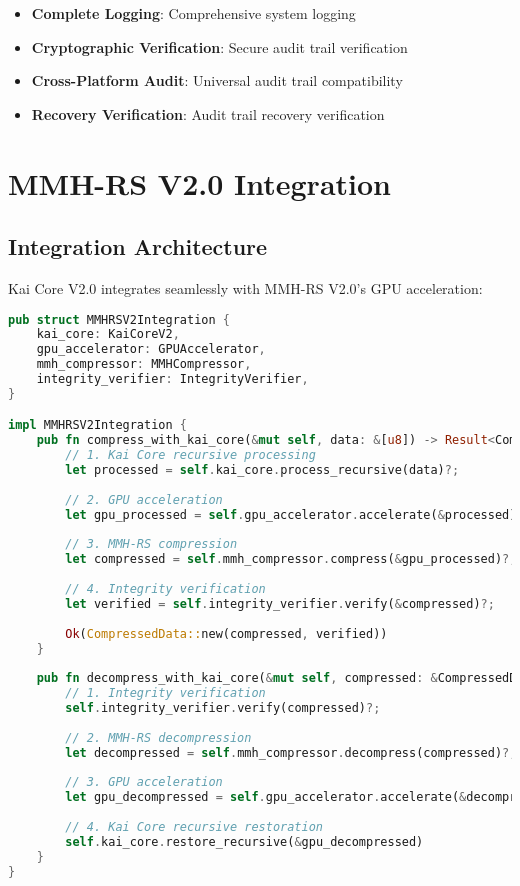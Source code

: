 \documentclass[12pt,a4paper]{article}
\begin{document}
\begin{itemize}
    \item \textbf{Complete Logging}: Comprehensive system logging
    \item \textbf{Cryptographic Verification}: Secure audit trail verification
    \item \textbf{Cross-Platform Audit}: Universal audit trail compatibility
    \item \textbf{Recovery Verification}: Audit trail recovery verification
\end{itemize}

\newpage

\section{MMH-RS V2.0 Integration}

\subsection{Integration Architecture}
Kai Core V2.0 integrates seamlessly with MMH-RS V2.0's GPU acceleration:

\begin{lstlisting}[language=Rust, caption=MMH-RS V2.0 Integration]
pub struct MMHRSV2Integration {
    kai_core: KaiCoreV2,
    gpu_accelerator: GPUAccelerator,
    mmh_compressor: MMHCompressor,
    integrity_verifier: IntegrityVerifier,
}

impl MMHRSV2Integration {
    pub fn compress_with_kai_core(&mut self, data: &[u8]) -> Result<CompressedData> {
        // 1. Kai Core recursive processing
        let processed = self.kai_core.process_recursive(data)?;
        
        // 2. GPU acceleration
        let gpu_processed = self.gpu_accelerator.accelerate(&processed)?;
        
        // 3. MMH-RS compression
        let compressed = self.mmh_compressor.compress(&gpu_processed)?;
        
        // 4. Integrity verification
        let verified = self.integrity_verifier.verify(&compressed)?;
        
        Ok(CompressedData::new(compressed, verified))
    }
    
    pub fn decompress_with_kai_core(&mut self, compressed: &CompressedData) -> Result<Vec<u8>> {
        // 1. Integrity verification
        self.integrity_verifier.verify(compressed)?;
        
        // 2. MMH-RS decompression
        let decompressed = self.mmh_compressor.decompress(compressed)?;
        
        // 3. GPU acceleration
        let gpu_decompressed = self.gpu_accelerator.accelerate(&decompressed)?;
        
        // 4. Kai Core recursive restoration
        self.kai_core.restore_recursive(&gpu_decompressed)
    }
}
\end{lstlisting}
\end{document}
